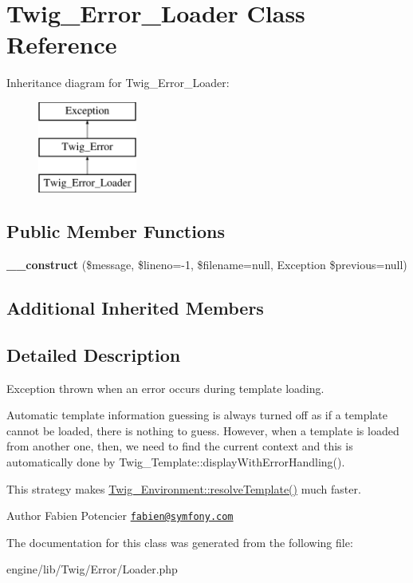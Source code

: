 \hypertarget{class_twig___error___loader}{}\section{Twig\+\_\+\+Error\+\_\+\+Loader Class Reference}
\label{class_twig___error___loader}
Inheritance diagram for Twig\+\_\+\+Error\+\_\+\+Loader\+:\begin{figure}[H]
\begin{center}
\leavevmode
\includegraphics[height=3.000000cm]{class_twig___error___loader}
\end{center}
\end{figure}
\subsection*{Public Member Functions}
\begin{DoxyCompactItemize}
\item 
\hypertarget{class_twig___error___loader_a61443b1ca6c32f74ff85c2fd550110cf}{}{\bfseries \+\_\+\+\_\+construct} (\$message, \$lineno=-\/1, \$filename=null, Exception \$previous=null)\label{class_twig___error___loader_a61443b1ca6c32f74ff85c2fd550110cf}

\end{DoxyCompactItemize}
\subsection*{Additional Inherited Members}


\subsection{Detailed Description}
Exception thrown when an error occurs during template loading.

Automatic template information guessing is always turned off as if a template cannot be loaded, there is nothing to guess. However, when a template is loaded from another one, then, we need to find the current context and this is automatically done by Twig\+\_\+\+Template\+::display\+With\+Error\+Handling().

This strategy makes \hyperlink{class_twig___environment_af1cc34fcbd8561be8a6075517d107630}{Twig\+\_\+\+Environment\+::resolve\+Template()} much faster.

\begin{DoxyAuthor}{Author}
Fabien Potencier \href{mailto:fabien@symfony.com}{\tt fabien@symfony.\+com} 
\end{DoxyAuthor}


The documentation for this class was generated from the following file\+:\begin{DoxyCompactItemize}
\item 
engine/lib/\+Twig/\+Error/Loader.\+php\end{DoxyCompactItemize}
